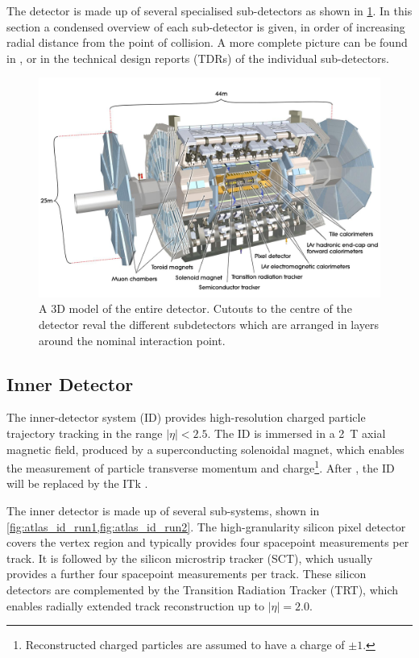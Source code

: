 The detector is made up of several specialised sub-detectors as shown in \cref{fig:atlas_detector}.
In this section a condensed overview of each sub-detector is given, in order of increasing radial distance from the point of collision.
A more complete picture can be found in , or in the technical design reports (TDRs) of the individual sub-detectors.

\begin{figure}[!htpb]
  \centering
  \includegraphics[width=0.9\linewidth]{chapters/2.detector/figs/atlas_detector.jpg}
  \caption{
    A 3D model of the entire \ATLAS detector. 
    Cutouts to the centre of the detector reval the different subdetectors which are arranged in layers around the nominal interaction point.
  }
  \label{fig:atlas_detector}
\end{figure}
%


\subsection{Inner Detector}\label{sec:atlas_id}

The inner-detector system (ID) provides high-resolution charged particle trajectory tracking in the range $|\eta| < 2.5$.
The ID is immersed in a \SI{2}{\tesla} axial magnetic field, produced by a superconducting solenoidal magnet, which enables the measurement of particle transverse momentum and charge\footnote{Reconstructed charged particles are assumed to have a charge of $\pm 1$.}.
After \runthree, the ID will be replaced by the ITk \cite{ATLAS-TDR-30,ATLAS-TDR-25}.

The inner detector is made up of several sub-systems, shown in \cref{fig:atlas_id_run1,fig:atlas_id_run2}.
The high-granularity silicon pixel detector covers the vertex region and typically provides four spacepoint measurements per track.
It is followed by the silicon microstrip tracker (SCT), which usually provides a further four spacepoint measurements per track.
These silicon detectors are complemented by the Transition Radiation Tracker (TRT),
which enables radially extended track reconstruction up to $|\eta| = 2.0$. 

